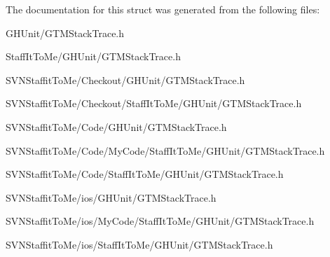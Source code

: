 \-The documentation for this struct was generated from the following files\-:\begin{DoxyCompactItemize}
\item 
\-G\-H\-Unit/\-G\-T\-M\-Stack\-Trace.\-h\item 
\-Staff\-It\-To\-Me/\-G\-H\-Unit/\-G\-T\-M\-Stack\-Trace.\-h\item 
\-S\-V\-N\-Staffit\-To\-Me/\-Checkout/\-G\-H\-Unit/\-G\-T\-M\-Stack\-Trace.\-h\item 
\-S\-V\-N\-Staffit\-To\-Me/\-Checkout/\-Staff\-It\-To\-Me/\-G\-H\-Unit/\-G\-T\-M\-Stack\-Trace.\-h\item 
\-S\-V\-N\-Staffit\-To\-Me/\-Code/\-G\-H\-Unit/\-G\-T\-M\-Stack\-Trace.\-h\item 
\-S\-V\-N\-Staffit\-To\-Me/\-Code/\-My\-Code/\-Staff\-It\-To\-Me/\-G\-H\-Unit/\-G\-T\-M\-Stack\-Trace.\-h\item 
\-S\-V\-N\-Staffit\-To\-Me/\-Code/\-Staff\-It\-To\-Me/\-G\-H\-Unit/\-G\-T\-M\-Stack\-Trace.\-h\item 
\-S\-V\-N\-Staffit\-To\-Me/ios/\-G\-H\-Unit/\-G\-T\-M\-Stack\-Trace.\-h\item 
\-S\-V\-N\-Staffit\-To\-Me/ios/\-My\-Code/\-Staff\-It\-To\-Me/\-G\-H\-Unit/\-G\-T\-M\-Stack\-Trace.\-h\item 
\-S\-V\-N\-Staffit\-To\-Me/ios/\-Staff\-It\-To\-Me/\-G\-H\-Unit/\-G\-T\-M\-Stack\-Trace.\-h\end{DoxyCompactItemize}
